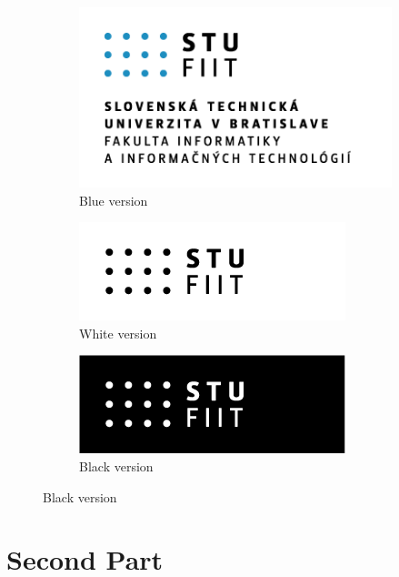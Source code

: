 \documentclass[10pt,twoside,english,a4paper]{article}
\begin{document}
\begin{figure}[h]
	\caption{All variations of FIIT LOGO}
	\label{fig:logos}
	\begin{subfigure}[b]{0.3\textwidth}
		\centering
		\includegraphics[scale=0.3]{STU-FIIT-nfv.png}
		\caption{Blue version}
	\end{subfigure}
	\begin{subfigure}[b]{0.3\textwidth}
		\centering
		\includegraphics[scale=0.3]{STU-FIIT-zcv.png}
		\caption{White version}
	\end{subfigure}
	\begin{subfigure}[b]{0.3\textwidth}
		\centering
		\includegraphics[scale=0.3]{STU-FIIT-zcvn.png}
		\caption{Black version}
	\end{subfigure}
\end{figure}

\section{Second Part}



% 
\end{document}
